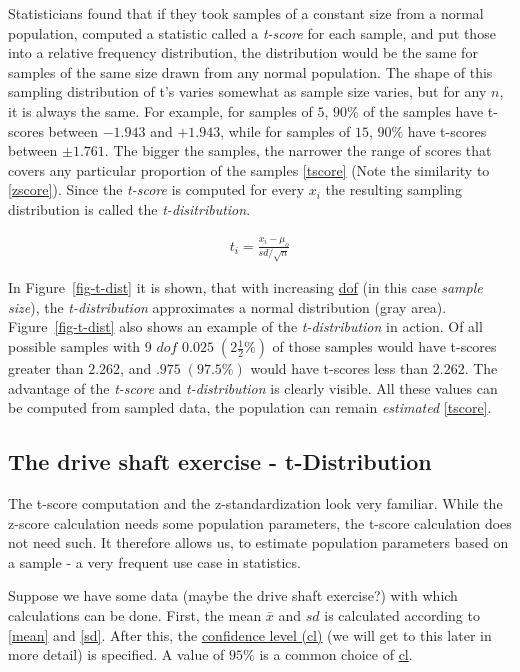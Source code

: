 \documentclass[
  a4paper,
]{scrbook}
\begin{document}
Statisticians found that if they took samples of a constant size from a
normal population, computed a statistic called a \emph{t-score} for each
sample, and put those into a relative frequency distribution, the
distribution would be the same for samples of the same size drawn from
any normal population. The shape of this sampling distribution of t's
varies somewhat as sample size varies, but for any \(n\), it is always
the same. For example, for samples of \(5\), \(90\%\) of the samples
have t-scores between \(-1.943\) and \(+1.943\), while for samples of
\(15\), \(90\%\) have t-scores between \(\pm 1.761\). The bigger the
samples, the narrower the range of scores that covers any particular
proportion of the samples \eqref{tscore} (Note the similarity to
\eqref{zscore}). Since the \emph{t-score} is computed for every \(x_i\)
the resulting sampling distribution is called the
\emph{t-disitribution}.

\begin{align}
t_i = \frac{x_i - \mu_o}{sd/\sqrt{n}} \label{tscore}
\end{align}

In Figure~\ref{fig-t-dist} it is shown, that with increasing
\hyperref[acronyms_dof]{dof} (in this case \emph{sample size}), the
\emph{t-distribution} approximates a normal distribution (gray area).
Figure~\ref{fig-t-dist} also shows an example of the
\emph{t-distribution} in action. Of all possible samples with 9
\hyperref[dof]{\(dof\)} \(0.025\;(2\frac{1}{2}\%)\) of those samples
would have t-scores greater than \(2.262\), and \(.975\;(97.5\%)\) would
have t-scores less than \(2.262\). The advantage of the \emph{t-score}
and \emph{t-distribution} is clearly visible. All these values can be
computed from sampled data, the population can remain \emph{estimated}
\eqref{tscore}.

\subsection{The drive shaft exercise -
t-Distribution}\label{the-drive-shaft-exercise---t-distribution}

The t-score computation and the z-standardization look very familiar.
While the z-score calculation needs some population parameters, the
t-score calculation does not need such. It therefore allows us, to
estimate population parameters based on a sample - a very frequent use
case in statistics.

Suppose we have some data (maybe the drive shaft exercise?) with which
calculations can be done. First, the mean \(\bar{x}\) and \(sd\) is
calculated according to \eqref{mean} and \eqref{sd}. After this, the
\hyperref[acronyms_cl]{confidence level (cl)} (we will get to this later
in more detail) is specified. A value of \(95\%\) is a common choice of
\hyperref[acronyms_cl]{cl}.
\end{document}
